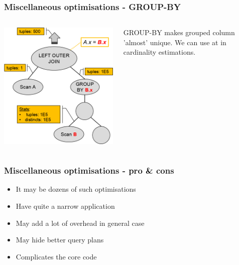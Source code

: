 \documentclass{beamer}
\begin{document}
\begin{frame}[fragile]\frametitle{Miscellaneous optimisations - GROUP-BY}
\begin{columns}[T]\begin{column}{0.6\textwidth}
  \includegraphics[scale=0.5]{pics/group-by-unique.png}
\end{column}\begin{column}{0.4\textwidth}
GROUP-BY makes grouped column 'almost' unique. We can use at in cardinality estimations.
\end{column}\end{columns}
\end{frame}

\begin{frame}[fragile]\frametitle{Miscellaneous optimisations - pro \& cons}
\begin{itemize}
  \item It may be dozens of such optimisations
  \item Have quite a narrow application
  \item May add a lot of overhead in general case
  \item May hide better query plans
  \item Complicates the core code
\end{itemize}
\end{frame}
\end{document}
